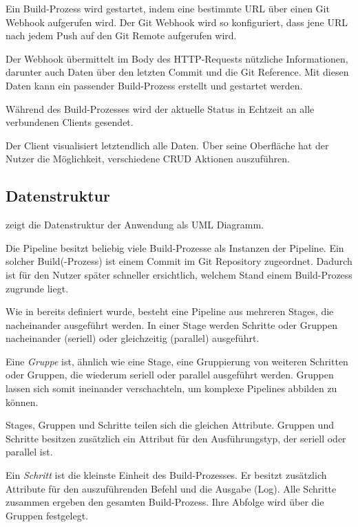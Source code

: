 Ein Build-Prozess wird gestartet, indem eine bestimmte URL über einen Git Webhook aufgerufen wird. Der Git Webhook wird so konfiguriert, dass jene URL nach jedem Push auf den Git Remote aufgerufen wird.

Der Webhook übermittelt im Body des HTTP-Requests nützliche Informationen, darunter auch Daten über den letzten Commit und die Git Reference. Mit diesen Daten kann ein passender Build-Prozess erstellt und gestartet werden.

Während des Build-Prozesses wird der aktuelle Status in Echtzeit an alle verbundenen Clients gesendet.

Der Client visualisiert letztendlich alle Daten. Über seine Oberfläche hat der Nutzer die Möglichkeit, verschiedene \ac{CRUD} Aktionen auszuführen.

\subsection{Datenstruktur}
\label{subsec:uml}

 zeigt die Datenstruktur der Anwendung als UML Diagramm.

Die Pipeline besitzt beliebig viele Build-Prozesse als Instanzen der Pipeline. Ein solcher Build(-Prozess) ist einem Commit im Git Repository zugeordnet. Dadurch ist für den Nutzer später schneller ersichtlich, welchem Stand einem Build-Prozess zugrunde liegt.

Wie in  bereits definiert wurde, besteht eine Pipeline aus mehreren Stages, die nacheinander ausgeführt werden. In einer Stage werden Schritte oder Gruppen nacheinander (seriell) oder gleichzeitig (parallel) ausgeführt.

Eine \emph{Gruppe} ist, ähnlich wie eine Stage, eine Gruppierung von weiteren Schritten oder Gruppen, die wiederum seriell oder parallel ausgeführt werden. Gruppen lassen sich somit ineinander verschachteln, um komplexe Pipelines abbilden zu können.

Stages, Gruppen und Schritte teilen sich die gleichen Attribute. Gruppen und Schritte besitzen zusätzlich ein Attribut für den Ausführungstyp, der seriell oder parallel ist.

Ein \emph{Schritt} ist die kleinste Einheit des Build-Prozesses. Er besitzt zusätzlich Attribute für den auszuführenden Befehl und die Ausgabe (Log). Alle Schritte zusammen ergeben den gesamten Build-Prozess. Ihre Abfolge wird über die Gruppen festgelegt.

